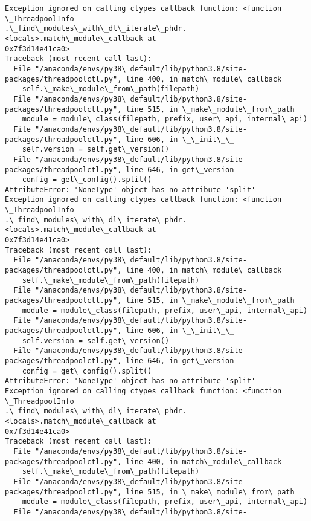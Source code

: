 \documentclass[11pt]{article}
\begin{document}
    \begin{Verbatim}[commandchars=\\\{\}]
Exception ignored on calling ctypes callback function: <function \_ThreadpoolInfo
.\_find\_modules\_with\_dl\_iterate\_phdr.<locals>.match\_module\_callback at
0x7f3d14e41ca0>
Traceback (most recent call last):
  File "/anaconda/envs/py38\_default/lib/python3.8/site-
packages/threadpoolctl.py", line 400, in match\_module\_callback
    self.\_make\_module\_from\_path(filepath)
  File "/anaconda/envs/py38\_default/lib/python3.8/site-
packages/threadpoolctl.py", line 515, in \_make\_module\_from\_path
    module = module\_class(filepath, prefix, user\_api, internal\_api)
  File "/anaconda/envs/py38\_default/lib/python3.8/site-
packages/threadpoolctl.py", line 606, in \_\_init\_\_
    self.version = self.get\_version()
  File "/anaconda/envs/py38\_default/lib/python3.8/site-
packages/threadpoolctl.py", line 646, in get\_version
    config = get\_config().split()
AttributeError: 'NoneType' object has no attribute 'split'
Exception ignored on calling ctypes callback function: <function \_ThreadpoolInfo
.\_find\_modules\_with\_dl\_iterate\_phdr.<locals>.match\_module\_callback at
0x7f3d14e41ca0>
Traceback (most recent call last):
  File "/anaconda/envs/py38\_default/lib/python3.8/site-
packages/threadpoolctl.py", line 400, in match\_module\_callback
    self.\_make\_module\_from\_path(filepath)
  File "/anaconda/envs/py38\_default/lib/python3.8/site-
packages/threadpoolctl.py", line 515, in \_make\_module\_from\_path
    module = module\_class(filepath, prefix, user\_api, internal\_api)
  File "/anaconda/envs/py38\_default/lib/python3.8/site-
packages/threadpoolctl.py", line 606, in \_\_init\_\_
    self.version = self.get\_version()
  File "/anaconda/envs/py38\_default/lib/python3.8/site-
packages/threadpoolctl.py", line 646, in get\_version
    config = get\_config().split()
AttributeError: 'NoneType' object has no attribute 'split'
Exception ignored on calling ctypes callback function: <function \_ThreadpoolInfo
.\_find\_modules\_with\_dl\_iterate\_phdr.<locals>.match\_module\_callback at
0x7f3d14e41ca0>
Traceback (most recent call last):
  File "/anaconda/envs/py38\_default/lib/python3.8/site-
packages/threadpoolctl.py", line 400, in match\_module\_callback
    self.\_make\_module\_from\_path(filepath)
  File "/anaconda/envs/py38\_default/lib/python3.8/site-
packages/threadpoolctl.py", line 515, in \_make\_module\_from\_path
    module = module\_class(filepath, prefix, user\_api, internal\_api)
  File "/anaconda/envs/py38\_default/lib/python3.8/site-

\end{Verbatim}
\end{document}
